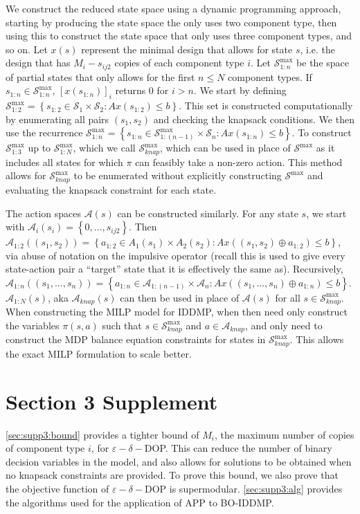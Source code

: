\documentclass[11pt,authoryear,a4paper]{article}
\theoremstyle{definition}
\begin{document}
We construct the reduced state space using a dynamic programming approach, starting by producing the state space the only uses two component type, then using this to construct the state space that only uses three component types, and so on. Let $x(s)$ represent the minimal design that allows for state $s$, i.e. the design that has $M_i-s_{ij2}$ copies of each component type $i$. Let $\mathcal{S}^{\max}_{1:n}$ be the space of partial states that only allows for the first $n\leq N$ component types. If $s_{1:n}\in \mathcal{S}^{\max}_{1:n}$, $[x(s_{1:n})]_i$ returns 0 for $i>n$. We start by defining $\mathcal{S}^{\max}_{1:2}=\left\{s_{1:2}\in \mathcal{S}_1\times \mathcal{S}_2: Ax(s_{1:2})\leq b\right\}$. This set is constructed computationally by enumerating all pairs $(s_1,s_2)$ and checking the knapsack conditions. We then use the recurrence $\mathcal{S}^{\max}_{1:n}=\left\{s_{1:n}\in \mathcal{S}^{\max}_{1:(n-1)}\times \mathcal{S}_n:Ax(s_{1:n})\leq b\right\}$. To construct $\mathcal{S}^{\max}_{1:3}$ up to $\mathcal{S}^{\max}_{1:N}$, which we call $\mathcal{S}^{\max}_{knap}$, which can be used in place of $\mathcal{S}^{\max}$ as it includes all states for which $\pi$ can feasibly take a non-zero action. This method allows for $\mathcal{S}^{\max}_{knap}$ to be enumerated without explicitly constructing $\mathcal{S}^{\max}$ and evaluating the knapsack constraint for each state.

The action spaces $\mathcal{A}(s)$ can be constructed similarly. For any state $s$, we start with $\mathcal{A}_i(s_i) = \left\{0,...,s_{ij2}\right\}$. Then $\mathcal{A}_{1:2}((s_1,s_2))=\left\{a_{1:2}\in A_1(s_1)\times A_2(s_2):Ax((s_1,s_2)\oplus a_{1:2})\leq b\right\}$, via abuse of notation on the impulsive operator (recall this is used to give every state-action pair a ``target'' state that it is effectively the same as). Recursively, $\mathcal{A}_{1:n}((s_1,...,s_n))=\left\{a_{1:n}\in \mathcal{A}_{1:(n-1)}\times \mathcal{A}_n: Ax((s_1,...,s_n)\oplus a_{1:n})\leq b\right\}$. $\mathcal{A}_{1:N}(s)$, aka $\mathcal{A}_{knap}(s)$ can then be used in place of $\mathcal{A}(s)$ for all $s\in\mathcal{S}^{\max}_{knap}$. When constructing the MILP model for IDDMP, when then need only construct the variables $\pi(s,a)$ such that $s\in\mathcal{S}^{\max}_{knap}$ and $a\in\mathcal{A}_{knap}$, and only need to construct the MDP balance equation constraints for states in $\mathcal{S}^{\max}_{knap}$. This allows the exact MILP formulation to scale better.


\newpage
\section{Section 3 Supplement}
\label{sec:supp3}
\autoref{sec:supp3:bound} provides a tighter bound of $M_i$, the maximum number of copies of component type $i$, for $\varepsilon-\delta-$DOP. This can reduce the number of binary decision variables in the model, and also allows for solutions to be obtained when no knapsack constraints are provided. To prove this bound, we also prove that the objective function of $\varepsilon-\delta-$DOP is supermodular. \autoref{sec:supp3:alg} provides the algorithms used for the application of APP to BO-IDDMP.
\end{document}
